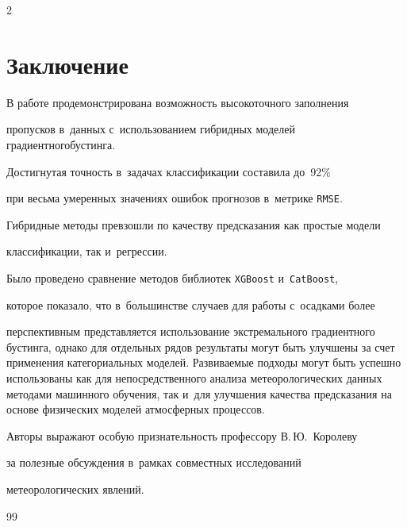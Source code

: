 \begin{multicols}{2}
\section{Заключение}



В работе продемонстрирована возможность высокоточного заполнения 

пропусков в~данных с~использованием гибридных моделей градиентного\linebreak бустинга. 

Достигнутая точность в~задачах классификации составила до~92\% 

при весьма умеренных значениях ошибок прогнозов в~метрике \verb"RMSE". 

Гибридные методы превзошли по качеству предсказания как простые модели 

классификации, так и~регрессии.



Было проведено сравнение методов библиотек \verb"XGBoost" и~\verb"CatBoost", 

которое показало, что в~большинстве случаев для работы с~осадками более 

перспективным представляется использование экс\-тремального градиентного бустинга, однако для отдельных рядов результаты могут быть улучшены за счет применения категориальных моделей. Развиваемые подходы могут быть успешно использованы как для непосредственного анализа метеорологических данных методами машинного обучения, так и~для улучшения качества предсказания на основе физических моделей атмосферных процессов.



\bigskip

Авторы выражают особую признательность профессору В.\,Ю.~Королеву 

за полезные обсуждения в~рамках совместных исследований 

метеорологических явлений.





\vspace*{-6pt}



{\small\frenchspacing

 {%


 \begin{thebibliography}{99}

 


\end{thebibliography}}}
\end{multicols}
